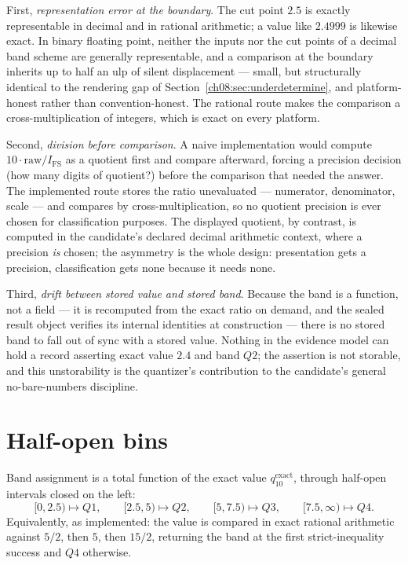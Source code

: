 First, \emph{representation error at the boundary}. The cut point $2.5$
is exactly representable in decimal and in rational arithmetic; a value
like $2.4999$ is likewise exact. In binary floating point, neither the
inputs nor the cut points of a decimal band scheme are generally
representable, and a comparison at the boundary inherits up to half an
ulp of silent displacement --- small, but structurally identical to the
rendering gap of Section~\ref{ch08:sec:underdetermine}, and
platform-honest rather than convention-honest. The rational route makes
the comparison a cross-multiplication of integers, which is exact on
every platform.

Second, \emph{division before comparison}. A naive implementation would
compute $10 \cdot \mathrm{raw} / I_{\mathrm{FS}}$ as a quotient first
and compare afterward, forcing a precision decision (how many digits of
quotient?) before the comparison that needed the answer. The
implemented route stores the ratio unevaluated --- numerator, denominator,
scale --- and compares by cross-multiplication, so no quotient precision
is ever chosen for classification purposes. The displayed quotient, by
contrast, is computed in the candidate's declared decimal arithmetic
context, where a precision \emph{is} chosen; the asymmetry is the whole
design: presentation gets a precision, classification gets none because
it needs none.

Third, \emph{drift between stored value and stored band}. Because the
band is a function, not a field --- it is recomputed from the exact
ratio on demand, and the sealed result object verifies its internal
identities at construction --- there is no stored band to fall out of
sync with a stored value. Nothing in the evidence model can hold a
record asserting exact value $2.4$ and band $Q2$; the assertion is not
storable, and this unstorability is the quantizer's contribution to the
candidate's general no-bare-numbers discipline.

\section{Half-open bins}\label{ch08:sec:bins}

\begin{definition}[Q4 bands]\label{ch08:def:bands}
Band assignment is a total function of the exact value
$q_{10}^{\mathrm{exact}}$, through half-open intervals closed on the left:
\[
[0, 2.5) \mapsto Q1, \qquad
[2.5, 5) \mapsto Q2, \qquad
[5, 7.5) \mapsto Q3, \qquad
[7.5, \infty) \mapsto Q4 .
\]
Equivalently, as implemented: the value is compared in exact rational
arithmetic against $5/2$, then $5$, then $15/2$, returning the band at the
first strict-inequality success and $Q4$ otherwise.
\end{definition}

